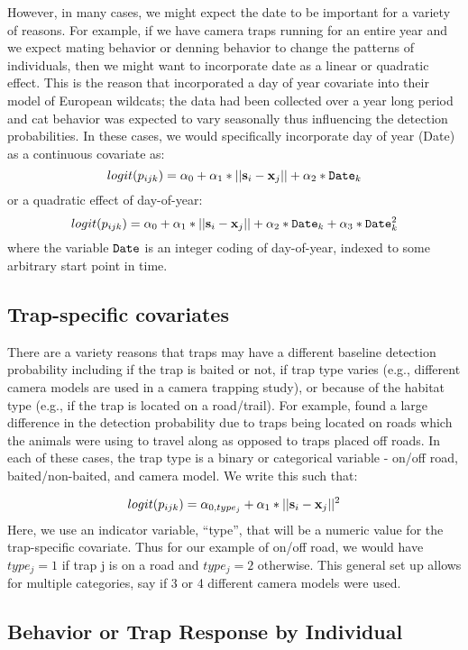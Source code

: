 However, in many cases, we might expect the date to be important for a
variety of reasons.  For example, if we have camera traps running for
an entire year and we expect mating behavior or denning behavior to
change the patterns of individuals, then we might want to incorporate
date as a linear or quadratic effect.  This is the reason that
\citet{kery_etal:2011} incorporated a day of year covariate into their
model of European wildcats; the data had been collected over a year
long period and cat behavior was expected to vary seasonally thus
influencing the detection probabilities.  In these cases, we would
specifically incorporate day of year (Date) as a continuous covariate
as:
\[
logit(p_{ijk}) = \alpha_0 + \alpha_1*||{\bf s}_{i}-{\bf x}_{j}|| + \alpha_2*\mbox{\tt Date}_{k}
\]
or a quadratic effect of day-of-year:
\[
logit(p_{ijk}) = \alpha_0 + \alpha_1*||{\bf s}_{i}-{\bf x}_{j}|| +
\alpha_2*\mbox{\tt Date}_{k}
 + \alpha_3*\mbox{\tt Date}_{k}^{2}
\]
where the variable $\mbox{\tt Date}$ is an integer coding of
day-of-year, indexed to some arbitrary start point in time.  

\subsection{Trap-specific covariates}

There are a variety reasons that traps may have a different baseline
detection probability including if the trap is baited or not, if trap
type varies (e.g., different camera models are used in a camera
trapping study), or because of the habitat type (e.g., if the trap is
located on a road/trail).  For example, \citet{sollmann_etal:2011}
found a large difference in the detection probability due to traps
being located on roads which the animals were using to travel along as
opposed to traps placed off roads.  In each of these cases, the trap
type is a binary or categorical variable - on/off road,
baited/non-baited, and camera model.  We write this such that:

\[
logit(p_{ijk}) = \alpha_{0, type_j} + \alpha_1*||{\bf s}_{i}-{\bf x}_{j}||^{2}
\]
Here, we use an indicator variable, ``type'', that will be a numeric
value for the trap-specific covariate.  Thus for our example of on/off
road, we would have $type_j = 1$ if trap j is on a road and $type_j
= 2$ otherwise.  This general set up allows for multiple categories,
say if 3 or 4 different camera models were used.


\subsection{Behavior or Trap Response by Individual}

